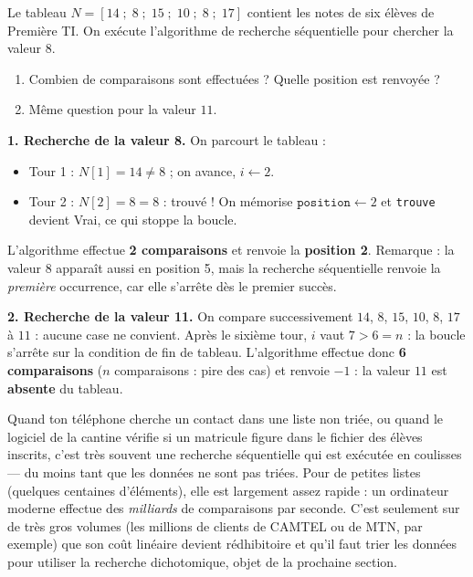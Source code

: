 \documentclass[11pt]{article}
\begin{document}
\begin{exoresolu}
Le tableau $N = [14 \;;\; 8 \;;\; 15 \;;\; 10 \;;\; 8 \;;\; 17]$ contient les notes de six élèves de Première TI. On exécute l'algorithme de recherche séquentielle pour chercher la valeur $8$.
\begin{enumerate}
\item Combien de comparaisons sont effectuées ? Quelle position est renvoyée ?
\item Même question pour la valeur $11$.
\end{enumerate}
\tcblower
\textbf{1. Recherche de la valeur 8.} On parcourt le tableau :
\begin{itemize}
\item Tour 1 : $N[1] = 14 \neq 8$ ; on avance, $i \leftarrow 2$.
\item Tour 2 : $N[2] = 8 = 8$ : trouvé ! On mémorise $\texttt{position} \leftarrow 2$ et \texttt{trouve} devient Vrai, ce qui stoppe la boucle.
\end{itemize}
L'algorithme effectue \textbf{2 comparaisons} et renvoie la \textbf{position 2}. Remarque : la valeur 8 apparaît aussi en position 5, mais la recherche séquentielle renvoie la \emph{première} occurrence, car elle s'arrête dès le premier succès.

\textbf{2. Recherche de la valeur 11.} On compare successivement $14$, $8$, $15$, $10$, $8$, $17$ à $11$ : aucune case ne convient. Après le sixième tour, $i$ vaut $7 > 6 = n$ : la boucle s'arrête sur la condition de fin de tableau. L'algorithme effectue donc \textbf{6 comparaisons} ($n$ comparaisons : pire des cas) et renvoie $-1$ : la valeur $11$ est \textbf{absente} du tableau.
\end{exoresolu}

\begin{savaistu}
Quand ton téléphone cherche un contact dans une liste non triée, ou quand le logiciel de la cantine vérifie si un matricule figure dans le fichier des élèves inscrits, c'est très souvent une recherche séquentielle qui est exécutée en coulisses — du moins tant que les données ne sont pas triées. Pour de petites listes (quelques centaines d'éléments), elle est largement assez rapide : un ordinateur moderne effectue des \emph{milliards} de comparaisons par seconde. C'est seulement sur de très gros volumes (les millions de clients de CAMTEL ou de MTN, par exemple) que son coût linéaire devient rédhibitoire et qu'il faut trier les données pour utiliser la recherche dichotomique, objet de la prochaine section.
\end{savaistu}
\end{document}
